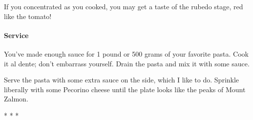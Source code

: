 If you concentrated as you cooked, you may get a taste of the rubedo stage, red like the tomato!

\paragraph{Service}


You've made enough sauce for 1 pound or 500 grams of your favorite pasta. Cook it al dente; don't embarrass yourself. Drain the pasta and mix it with some sauce.

Serve the pasta with some extra sauce on the side, which I like to do. Sprinkle liberally with some Pecorino cheese until the plate looks like the peaks of Mount Zalmon.



\begin{center}* * *\end{center}

